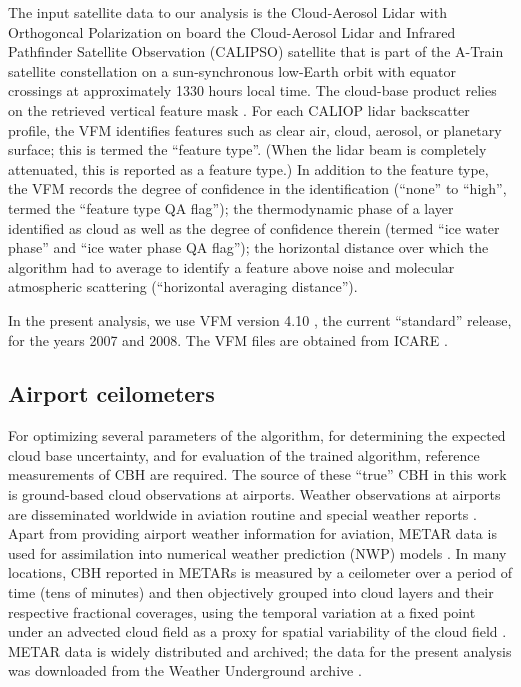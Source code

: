 \documentclass[essd,manuscript]{copernicus}\usepackage[]{graphicx}\usepackage[]{color}
\newcommand{\hlnum}[1]{\textcolor[rgb]{0.686,0.059,0.569}{#1}}%
\newcommand\comment[2]{\{\hlnum{ \textit{#1}: #2}\}}
\newcommand\commentjm[1]{\comment{$j_\mu$}{#1}}
\begin{document}
The input satellite data to our analysis is the Cloud-Aerosol Lidar with
Orthogoncal Polarization \cite[CALIOP][]{Winker2007} on board the Cloud-Aerosol Lidar and Infrared Pathfinder
Satellite Observation (CALIPSO) satellite that is part of the A-Train
satellite constellation \citep{Stephens2002} on a
sun-synchronous low-Earth orbit with equator crossings at approximately 1330 hours local
time. The cloud-base product relies on the retrieved vertical feature mask
\citep[VFM,][]{vaughan2002}.  For each CALIOP lidar backscatter profile, the VFM identifies features
such as clear air, cloud, aerosol, or planetary surface; this is termed the ``feature
type''.  (When the lidar beam is completely attenuated, this is reported as a
feature type.)  In addition to the feature type, the VFM records the degree of
confidence in the identification (``none'' to ``high'', termed the ``feature
type QA flag''); the thermodynamic phase of a layer identified as cloud as well
as the degree of confidence therein (termed ``ice water phase'' and ``ice water
phase QA flag''); the horizontal distance over which the algorithm had to
average to identify a feature above noise and molecular atmospheric scattering
(``horizontal averaging distance'').  

In the present analysis, we use VFM version 4.10 \citep{vfm}, the current
``standard'' release, for the years 2007 and 2008.  The VFM files are obtained
from ICARE \citep{icare}.

\subsection{Airport ceilometers}





For optimizing several parameters of the algorithm, for determining the expected
cloud base uncertainty, and for evaluation of the trained algorithm, reference
measurements of CBH are required.  The source of these ``true'' CBH in this work
is ground-based cloud observations at airports.  Weather observations at
airports are disseminated worldwide in aviation routine and special weather
reports \citep[METARs and SPECIs, collectively referred to as METARs
henceforth,][]{metar}.  Apart from providing airport weather information for
aviation, METAR data is used for assimilation into numerical weather prediction
(NWP) models \citep[e.g.,][]{Benjamin2016, Dee2011}.  In many locations, CBH
reported in METARs is measured by a ceilometer over a period of time (tens of
minutes) and then objectively grouped into cloud layers and their respective
fractional coverages, using the temporal variation at a fixed point under an
advected cloud field as a proxy for spatial variability of the cloud field
\citep[e.g.,][]{Heese2010}.  METAR data is widely distributed and archived; the
data for the present analysis was downloaded from the Weather Underground
archive \citep{wunderground}.
\end{document}
